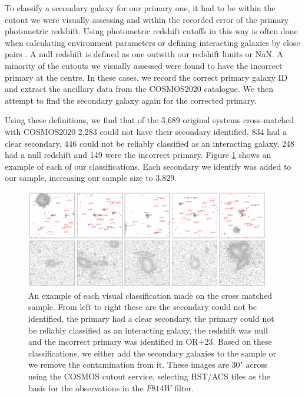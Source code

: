 To classify a secondary galaxy for our primary one, it had to be within the cutout we were visually assessing and within the recorded error of the primary photometric redshift. Using photometric redshift cutoffs in this way is often done when calculating environment parameters \citep[e.g][]{2006MNRAS.373..469B} or defining interacting galaxies by close pairs \citep[e.g][]{2022ApJ...940....4S}. A null redshift is defined as one outwith our redshift limits or NaN. A minority of the cutouts we visually assessed were found to have the incorrect primary at the centre. In these cases, we record the correct primary galaxy ID and extract the ancillary data from the COSMOS2020 catalogue. We then attempt to find the secondary galaxy again for the corrected primary.

Using these definitions, we find that of the 3,689 original systems cross-matched with COSMOS2020 2,283 could not have their secondary identified, 834 had a clear secondary, 446 could not be reliably classified as an interacting galaxy, 248 had a null redshift and 149 were the incorrect primary. Figure \ref{fig:secondary_selection} shows an example of each of our classifications. Each secondary we identify was added to our sample, increasing our sample size to 3,829.

\begin{figure}
    \centering
    \includegraphics[width=0.95\textwidth]{Chapter3/figures/cutouts_ex.pdf}
    \caption{An example of each visual classification made on the cross matched sample. From left to right these are the secondary could not be identified, the primary had a clear secondary, the primary could not be reliably classified as an interacting galaxy, the redshift was null and the incorrect primary was identified in OR+23. Based on these classifications, we either add the secondary galaxies to the sample or we remove the contamination from it. These images are 30" across using the COSMOS cutout service, selecting HST/ACS tiles as the basis for the observations in the $F814W$ filter.}
    \label{fig:secondary_selection}
\end{figure}

